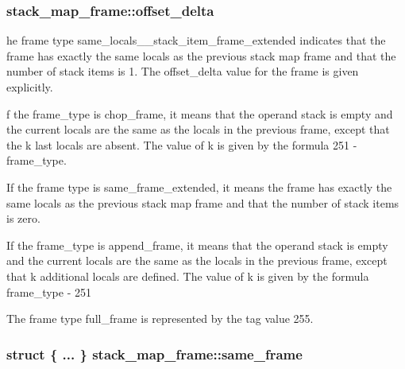 \subsubsection[{\texorpdfstring{offset\+\_\+delta}{offset_delta}}]{ stack\+\_\+map\+\_\+frame\+::offset\+\_\+delta}\hypertarget{structstack__map__frame_a6eb1565feda91c1edced70dc473c834d}{}\label{structstack__map__frame_a6eb1565feda91c1edced70dc473c834d}
he frame type same\+\_\+locals\+\_\+\_\+stack\+\_\+item\+\_\+frame\+\_\+extended indicates that the frame has exactly the same locals as the previous stack map frame and that the number of stack items is 1. The offset\+\_\+delta value for the frame is given explicitly.

f the frame\+\_\+type is chop\+\_\+frame, it means that the operand stack is empty and the current locals are the same as the locals in the previous frame, except that the k last locals are absent. The value of k is given by the formula 251 -\/ frame\+\_\+type.

If the frame type is same\+\_\+frame\+\_\+extended, it means the frame has exactly the same locals as the previous stack map frame and that the number of stack items is zero.

If the frame\+\_\+type is append\+\_\+frame, it means that the operand stack is empty and the current locals are the same as the locals in the previous frame, except that k additional locals are defined. The value of k is given by the formula frame\+\_\+type -\/ 251

The frame type full\+\_\+frame is represented by the tag value 255. 
\subsubsection[{\texorpdfstring{same\+\_\+frame}{same_frame}}]{\setlength{\rightskip}{0pt plus 5cm}struct \{ ... \}   stack\+\_\+map\+\_\+frame\+::same\+\_\+frame}\hypertarget{structstack__map__frame_a761073b8521c7ac269b5357dfcf963b6}{}\label{structstack__map__frame_a761073b8521c7ac269b5357dfcf963b6}
